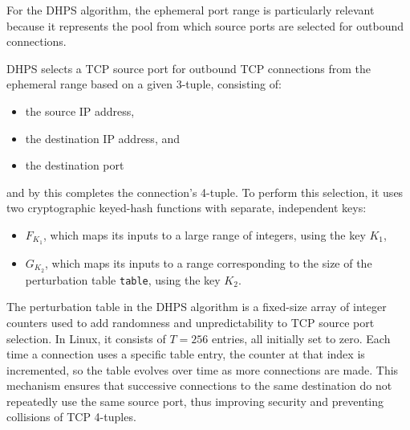 \documentclass{report}
\begin{document}
For the DHPS algorithm, the \alert{ephemeral port} range is particularly relevant because it represents the pool from which source ports are selected for outbound connections.

DHPS selects a TCP \alert{source port} for outbound TCP connections from the ephemeral range based on a given \alert{3-tuple}, consisting of:
\begin{itemize}
    \item the \alert{source IP} address,
    \item the \alert{destination IP} address, and
    \item the \alert{destination port}
\end{itemize}
and by this completes the connection’s \alert{4-tuple}. To perform this selection, it uses two \alert{cryptographic keyed-hash functions} with separate, independent keys:
\begin{itemize}
    \item \( F_{K_1} \), which maps its inputs to a large range of integers, using the key \( K_1 \),
    \item \( G_{K_2} \), which maps its inputs to a range corresponding to the size of the \alert{perturbation table} \texttt{table}, using the key \( K_2 \).
\end{itemize}

The \alert{perturbation table} in the DHPS algorithm is a fixed-size array of integer counters used to add randomness and unpredictability to TCP source port selection. In Linux, it consists of $T = 256$ entries, all initially set to zero. Each time a connection uses a specific table entry, the counter at that index is incremented, so the table evolves over time as more connections are made. This mechanism ensures that successive connections to the same destination do not repeatedly use the same source port, thus improving security and preventing collisions of TCP 4-tuples.


\end{document}
